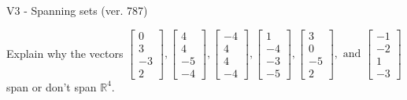 \begin{exercise}
  \begin{exerciseTitle}V3 - Spanning sets (ver. 787)\end{exerciseTitle}
  \begin{exerciseStatement}
    Explain why the vectors \(\left[\begin{array}{r}
0 \\
3 \\
-3 \\
2
\end{array}\right] , \left[\begin{array}{r}
4 \\
4 \\
-5 \\
-4
\end{array}\right] , \left[\begin{array}{r}
-4 \\
4 \\
4 \\
-4
\end{array}\right] , \left[\begin{array}{r}
1 \\
-4 \\
-3 \\
-5
\end{array}\right] , \left[\begin{array}{r}
3 \\
0 \\
-5 \\
2
\end{array}\right] , \text{ and } \left[\begin{array}{r}
-1 \\
-2 \\
1 \\
-3
\end{array}\right]\) span or don't span \(\mathbb{R}^4\). 
	



\end{exerciseStatement}
\end{exercise}
